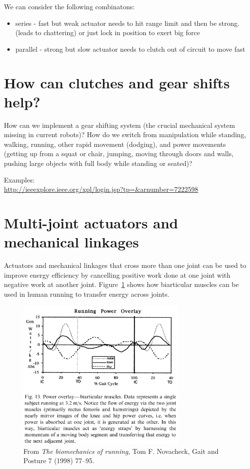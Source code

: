 \documentclass[letterpaper,12pt,fullpage]{article}
\begin{document}
We can consider the following combinatons:
\begin{itemize}
\item
series - fast but weak actuator needs to hit range limit and then be strong. (leads to chattering) or just lock in position to exert big force
\item
parallel - strong but slow actuator needs to clutch out of circuit to move fast
\end{itemize}

\section{How can clutches and gear shifts help?}

How can we implement a gear shifting system (the crucial mechanical
system missing in current robots)? How do we switch from manipulation
while standing, walking, running, other rapid movement (dodging), and
power movements (getting up from a squat or chair,
jumping, moving through doors and walls, pushing large objects
with full body while standing or seated)?

Examples:\\
\url{http://ieeexplore.ieee.org/xpl/login.jsp?tp=&arnumber=7222598}\\

\section{Multi-joint actuators and mechanical linkages}

Actuators and mechanical linkages that cross more than one joint
can be used to improve energy efficiency by cancelling positive
work done at one joint with negative work at another joint.
Figure~\ref{f:hip-knee} shows how biarticular muscles can be used
in human running to transfer energy across joints.

\begin{figure}[t]
\centering
\includegraphics[width=0.75\textwidth]{figs/shc1}
\caption{From {\it The biomechanics of running,}
Tom F. Novacheck,
Gait and Posture 7 (1998) 77–95.}
\label{f:hip-knee}
\end{figure}
\end{document}
